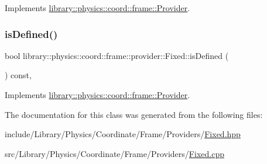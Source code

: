 Implements \hyperlink{classlibrary_1_1physics_1_1coord_1_1frame_1_1_provider_a796fd2dd337f1304a0e9acf573ce2550}{library\+::physics\+::coord\+::frame\+::\+Provider}.

\mbox{\label{classlibrary_1_1physics_1_1coord_1_1frame_1_1provider_1_1_fixed_ac7a58fa0937c28ed0289c1088275c3d2}} 
\subsubsection{\texorpdfstring{is\+Defined()}{isDefined()}}
{\footnotesize\ttfamily bool library\+::physics\+::coord\+::frame\+::provider\+::\+Fixed\+::is\+Defined (\begin{DoxyParamCaption}{ }\end{DoxyParamCaption}) const\hspace{0.3cm}{\ttfamily [override]}, {\ttfamily [virtual]}}



Implements \hyperlink{classlibrary_1_1physics_1_1coord_1_1frame_1_1_provider_ae7cd093febf2b20f71400f9f79442774}{library\+::physics\+::coord\+::frame\+::\+Provider}.



The documentation for this class was generated from the following files\+:\begin{DoxyCompactItemize}
\item 
include/\+Library/\+Physics/\+Coordinate/\+Frame/\+Providers/\hyperlink{_fixed_8hpp}{Fixed.\+hpp}\item 
src/\+Library/\+Physics/\+Coordinate/\+Frame/\+Providers/\hyperlink{_fixed_8cpp}{Fixed.\+cpp}\end{DoxyCompactItemize}
